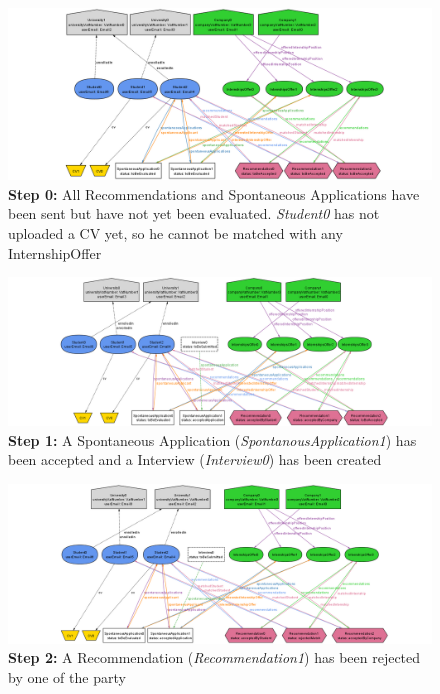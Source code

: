 \begin{figure}[H]
    \hspace{-2.5cm}
    \includegraphics[width=1.3\linewidth]{Latex/Images/RASD/Alloy/0.png}
    \caption*{\textbf{Step 0:} All Recommendations and Spontaneous Applications have been sent but have not yet been evaluated. \textit{Student0} has not uploaded a CV yet, so he cannot be matched with any InternshipOffer}
    \label{fig:ALIMG0}
\end{figure}
\begin{figure}[H]
    \hspace{-2.5cm}
    \includegraphics[width=1.3\linewidth]{Latex/Images/RASD/Alloy/1.png}
    \caption*{\textbf{Step 1:} A Spontaneous Application (\textit{SpontanousApplication1}) has been accepted and a Interview  (\textit{Interview0}) has been created}
    \label{fig:ALIMG1}
\end{figure}
\begin{figure}[H]
    \hspace{-2.5cm}
    \includegraphics[width=1.3\linewidth]{Latex/Images/RASD/Alloy/2.png}
    \caption*{\textbf{Step 2:} A Recommendation (\textit{Recommendation1}) has been rejected by one of the party}
    \label{fig:ALIMG2}
\end{figure}
